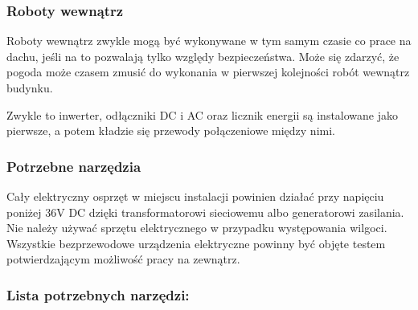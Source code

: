 \documentclass[12pt,a4paper]{article}
\begin{document}
 

\subsubsection{Roboty wewnątrz }
Roboty wewnątrz zwykle mogą być wykonywane w tym samym czasie co prace 
na dachu, jeśli na to pozwalają tylko względy bezpieczeństwa. Może się 
zdarzyć, że pogoda może czasem zmusić do wykonania w pierwszej 
kolejności robót wewnątrz budynku. 

Zwykle to inwerter, odłączniki DC i AC oraz licznik energii są 
instalowane jako pierwsze, a potem kładzie się przewody połączeniowe 
między nimi. 

 

\subsubsection{Potrzebne narzędzia}

Cały elektryczny osprzęt w miejscu instalacji powinien działać przy 
napięciu poniżej 36V DC dzięki transformatorowi sieciowemu albo 
generatorowi zasilania. Nie należy używać sprzętu elektrycznego w 
przypadku występowania wilgoci. Wszystkie bezprzewodowe urządzenia 
elektryczne powinny być objęte testem potwierdzającym możliwość pracy na 
zewnątrz. 

 

\subsubsection{Lista potrzebnych narzędzi:}
\end{document}
